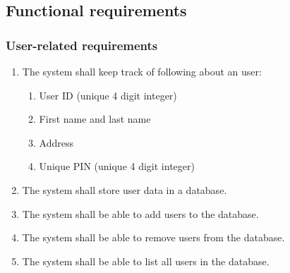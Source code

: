 \documentclass[12pt,titlepage,bibliography=totoc]{article}
\begin{document}
\begin{usecase}
\end{usecase}

\begin{usecase}
\end{usecase}
\subsection{Functional requirements}
\subsubsection{User-related requirements}
\begin{enumerate}
	\item The system shall keep track of following about an user:
	\begin{enumerate}
		\item User ID (unique 4 digit integer)
		\item First name and last name
		\item Address
		\item Unique PIN (unique 4 digit integer)
	\end{enumerate}
	\item The system shall store user data in a database.
	\item The system shall be able to add users to the database.
	\item The system shall be able to remove users from the database.
	\item The system shall be able to list all users in the database.
\end{enumerate}
\end{document}
